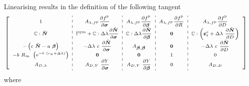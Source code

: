 Linearising  results in the definition of the following tangent
\begin{equation*}
	\scriptsize
	\left[ \begin{array}{c:c:c:c:c}
			1                                                                                                      & A_{\lambda,\Fp} \pd{\Fp}{\fsigma}                                        & A_{\lambda,\Fp} \pd{\Fp}{\fbeta}                       & A_{\lambda,\Fp} \pd{\Fp}{R} & A_{\lambda,\Fp} \pd{\Fp}{D}                                                                   \\
			\ffC \dcontraction \z{\fN}                                                                             & \ffI^{\rm sym} + \ffC \dcontraction \Delta \lambda \pd{\z{\fN}}{\fsigma} & \ffC \dcontraction \Delta \lambda \pd{\z{\fN}}{\fbeta} & \fzero                      & \ffC \dcontraction \left(\fepse_{\rm t} + \Delta \lambda \contraction \pd{\z{\fN}}{D} \right) \\
			- \left( c \contraction \z{\fN} - a \contraction \fbeta \right)                                        & -\Delta \lambda \contraction c \contraction \pd{\z{\fN}}{\fsigma}        & A_{\fbeta,\fbeta}                                      & \fzero                      & -\Delta \lambda \contraction c \contraction \pd{\z{\fN}}{D}                                   \\
			- b \contraction R_\infty \contraction \left(\mathrm{e}^{-b\contraction (r_n + \Delta \lambda)}\right) & \fzero                                                                   & \fzero                                                 & 1                           & 0                                                                                             \\
			A_{D,\lambda}                                                                                          & A_{D,Y} \contraction \pd{Y}{\fsigma}                                     & A_{D,Y} \contraction \pd{Y}{\fbeta}                    & 0                           & A_{D,D}                                                                                       \\
		\end{array} \right]
\end{equation*}
where
